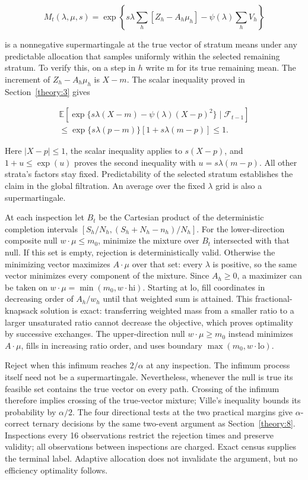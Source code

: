 \begin{equation}\label{eq:proofs-13}
M_t(\lambda,\mu,s)=\exp\!\left\{s\lambda\sum_h[Z_h-A_h\mu_h]-\psi(\lambda)\sum_hV_h\right\}
\end{equation}

is a nonnegative supermartingale at the true vector of stratum means under any predictable allocation that samples uniformly within the selected remaining stratum. To verify this, on a step in \(h\) write m for its true remaining mean. The increment of \(Z_h-A_h\mu_h\) is \(X-m\). The scalar inequality proved in Section~\ref{theory:3} gives

\begin{equation}\label{eq:proofs-14}
\begin{aligned}\mathbb E[\exp\{s\lambda(X-m)-\psi(\lambda)(X-p)^2\}\mid\mathcal F_{t-1}]\\\le \exp\{s\lambda(p-m)\}[1+s\lambda(m-p)]\le1.\end{aligned}
\end{equation}

Here \(|X-p|\le1\), the scalar inequality applies to \(s(X-p)\), and \(1+u\le\exp(u)\) proves the second inequality with \(u=s\lambda(m-p)\). All other strata's factors stay fixed. Predictability of the selected stratum establishes the claim in the global filtration. An average over the fixed \(\lambda\) grid is also a supermartingale.

At each inspection let \(B_t\) be the Cartesian product of the deterministic completion intervals \([S_h/N_h,(S_h+N_h-n_h)/N_h]\). For the lower-direction composite null \(w\cdot\mu\le m_0\), minimize the mixture over \(B_t\) intersected with that null. If this set is empty, rejection is deterministically valid. Otherwise the minimizing vector maximizes \(A\cdot\mu\) over that set: every \(\lambda\) is positive, so the same vector minimizes every component of the mixture. Since \(A_h\ge 0\), a maximizer can be taken on \(w\cdot\mu=\min(m_0,w\cdot\mathrm{hi})\). Starting at lo, fill coordinates in decreasing order of \(A_h/w_h\) until that weighted sum is attained. This fractional-knapsack solution is exact: transferring weighted mass from a smaller ratio to a larger unsaturated ratio cannot decrease the objective, which proves optimality by successive exchanges. The upper-direction null \(w\cdot\mu\ge m_0\) instead minimizes \(A\cdot\mu\), fills in increasing ratio order, and uses boundary \(\max(m_0,w\cdot\mathrm{lo})\).

Reject when this infimum reaches \(2/\alpha\) at any inspection. The infimum process itself need not be a supermartingale. Nevertheless, whenever the null is true its feasible set contains the true vector on every path. Crossing of the infimum therefore implies crossing of the true-vector mixture; Ville's inequality bounds its probability by \(\alpha/2\). The four directional tests at the two practical margins give \(\alpha\)-correct ternary decisions by the same two-event argument as Section~\ref{theory:8}. Inspections every 16 observations restrict the rejection times and preserve validity; all observations between inspections are charged. Exact census supplies the terminal label. Adaptive allocation does not invalidate the argument, but no efficiency optimality follows.

